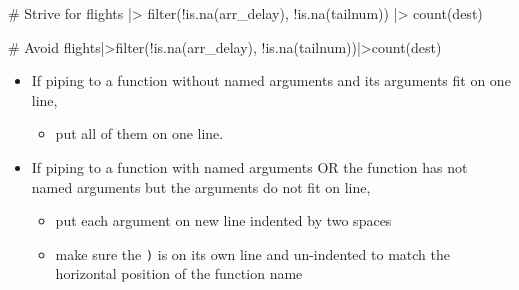\documentclass[
  letterpaper,
  DIV=11,
  numbers=noendperiod]{scrreprt}
\newenvironment{Shaded}{\begin{snugshade}}{\end{snugshade}}
\newcommand{\CommentTok}[1]{\textcolor[rgb]{0.37,0.37,0.37}{#1}}
\newcommand{\FunctionTok}[1]{\textcolor[rgb]{0.28,0.35,0.67}{#1}}
\newcommand{\NormalTok}[1]{\textcolor[rgb]{0.00,0.23,0.31}{#1}}
\newcommand{\SpecialCharTok}[1]{\textcolor[rgb]{0.37,0.37,0.37}{#1}}
\providecommand{\tightlist}{%
  \setlength{\itemsep}{0pt}\setlength{\parskip}{0pt}}\usepackage{longtable,booktabs,array}
\begin{document}
\begin{Shaded}
\begin{Highlighting}[]
\CommentTok{\# Strive for }
\NormalTok{flights }\SpecialCharTok{|\textgreater{}}  
  \FunctionTok{filter}\NormalTok{(}\SpecialCharTok{!}\FunctionTok{is.na}\NormalTok{(arr\_delay), }\SpecialCharTok{!}\FunctionTok{is.na}\NormalTok{(tailnum)) }\SpecialCharTok{|\textgreater{}} 
  \FunctionTok{count}\NormalTok{(dest)}

\CommentTok{\# Avoid}
\NormalTok{flights}\SpecialCharTok{|\textgreater{}}\FunctionTok{filter}\NormalTok{(}\SpecialCharTok{!}\FunctionTok{is.na}\NormalTok{(arr\_delay), }\SpecialCharTok{!}\FunctionTok{is.na}\NormalTok{(tailnum))}\SpecialCharTok{|\textgreater{}}\FunctionTok{count}\NormalTok{(dest)}
\end{Highlighting}
\end{Shaded}

\begin{itemize}
\tightlist
\item
  If piping to a function without named arguments and its arguments fit
  on one line,

  \begin{itemize}
  \tightlist
  \item
    put all of them on one line.
  \end{itemize}
\item
  If piping to a function with named arguments OR the function has not
  named arguments but the arguments do not fit on line,

  \begin{itemize}
  \tightlist
  \item
    put each argument on new line indented by two spaces
  \item
    make sure the \texttt{)} is on its own line and un-indented to match
    the horizontal position of the function name
  \end{itemize}
\end{itemize}
\end{document}
